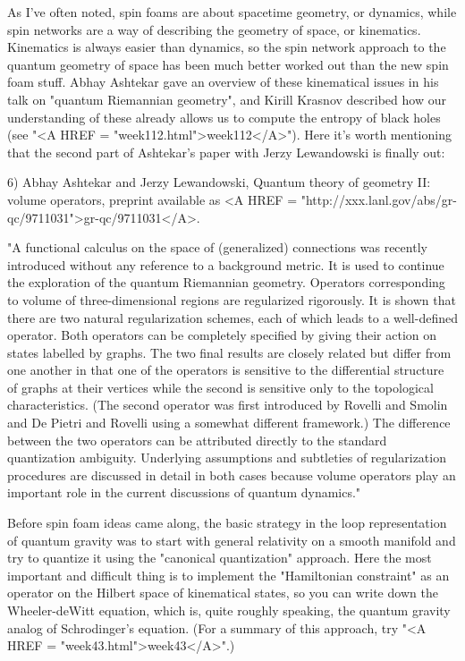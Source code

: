 As I've often noted, spin foams are about spacetime geometry,
or dynamics, while spin networks are a way of describing the
geometry of space, or kinematics.  Kinematics is always easier
than dynamics, so the spin network approach to the quantum geometry
of space has been much better worked out than the new spin foam stuff.
Abhay Ashtekar gave an overview of these kinematical issues in his
talk on "quantum Riemannian geometry", and Kirill Krasnov described
how our understanding of these already allows us to compute the entropy 
of black holes (see "<A HREF = "week112.html">week112</A>").  
Here it's worth mentioning that the second part of Ashtekar's paper 
with Jerzy Lewandowski is finally out:

6) Abhay Ashtekar and Jerzy Lewandowski, Quantum theory of geometry II:
volume operators, preprint available as <A HREF = "http://xxx.lanl.gov/abs/gr-qc/9711031">gr-qc/9711031</A>.  

"A functional calculus on the space of (generalized) connections was
recently introduced without any reference to a background metric.  It is
used to continue the exploration of the quantum Riemannian geometry.
Operators corresponding to volume of three-dimensional regions are
regularized rigorously.  It is shown that there are two natural
regularization schemes, each of which leads to a well-defined operator.
Both operators can be completely specified by giving their action on
states labelled by graphs.  The two final results are closely related
but differ from one another in that one of the operators is sensitive to
the differential structure of graphs at their vertices while the second
is sensitive only to the topological characteristics.  (The second
operator was first introduced by Rovelli and Smolin and De Pietri and
Rovelli using a somewhat different framework.)  The difference between
the two operators can be attributed directly to the standard
quantization ambiguity.  Underlying assumptions and subtleties of
regularization procedures are discussed in detail in both cases because
volume operators play an important role in the current discussions of
quantum dynamics."

Before spin foam ideas came along, the basic strategy in the loop
representation of quantum gravity was to start with general relativity
on a smooth manifold and try to quantize it using the "canonical 
quantization" approach.  Here the most important
and difficult thing is to implement the "Hamiltonian constraint" 
as an operator on the Hilbert space of kinematical states, so you can write
down the Wheeler-deWitt equation, which is, quite roughly speaking, the
quantum gravity analog of Schrodinger's equation.  (For a summary of
this approach, try "<A HREF = "week43.html">week43</A>".)

